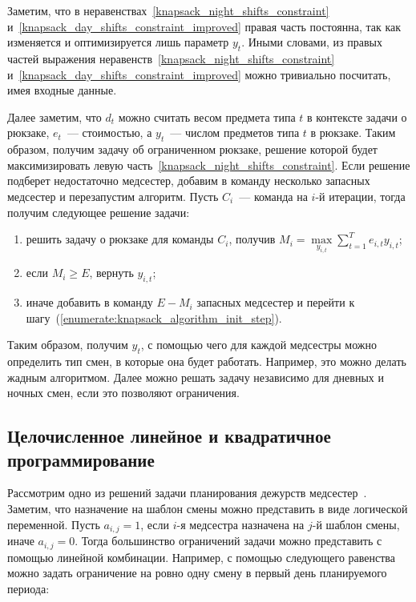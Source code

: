 \documentclass[times,specification,annotation]{itmo-student-thesis}
\begin{document}
Заметим, что в неравенствах~\eqref{knapsack_night_shifts_constraint} и~\eqref{knapsack_day_shifts_constraint_improved} правая часть постоянна, так как изменяется и оптимизируется лишь параметр $y_t$.
Иными словами, из правых частей выражения неравенств~\eqref{knapsack_night_shifts_constraint} и~\eqref{knapsack_day_shifts_constraint_improved} можно тривиально посчитать, имея входные данные.

Далее заметим, что $d_t$ можно считать весом предмета типа $t$ в контексте задачи о рюкзаке, $e_t$~--- стоимостью, а $y_t$~--- числом предметов типа $t$ в рюкзаке.
Таким образом, получим задачу об ограниченном рюкзаке, решение которой будет максимизировать левую часть~\eqref{knapsack_night_shifts_constraint}.
Если решение подберет недостаточно медсестер, добавим в команду несколько запасных медсестер и перезапустим алгоритм.
Пусть $C_i$~--- команда на $i$-й итерации, тогда получим следующее решение задачи:

\begin{enumerate}
    \item\label{enumerate:knapsack_algorithm_init_step} решить задачу о рюкзаке для команды $C_i$, получив $M_i = \max\limits_{y_{i, t}}{\sum\limits^T_{t=1}{e_{i, t} y_{i, t}}}$;
    \item если $M_i \ge E$, вернуть $y_{i, t}$;
    \item иначе добавить в команду $E - M_i$ запасных медсестер и перейти к шагу~(\ref{enumerate:knapsack_algorithm_init_step}).
\end{enumerate}

Таким образом, получим $y_t$, с помощью чего для каждой медсестры можно определить тип смен, в которые она будет работать.
Например, это можно делать жадным алгоритмом.
Далее можно решать задачу независимо для дневных и ночных смен, если это позволяют ограничения.

\subsection{Целочисленное линейное и квадратичное программирование} \label{milp_and_miqp_subsection}

Рассмотрим одно из решений задачи планирования дежурств медсестер~\cite{nsp_ilp}.
Заметим, что назначение на шаблон смены можно представить в виде логической переменной.
Пусть $a_{i, j} = 1$, если $i$-я медсестра назначена на $j$-й шаблон смены, иначе $a_{i, j} = 0$.
Тогда большинство ограничений задачи можно представить с помощью линейной комбинации.
Например, с помощью следующего равенства можно задать ограничение на ровно одну смену в первый день планируемого периода:
\end{document}
